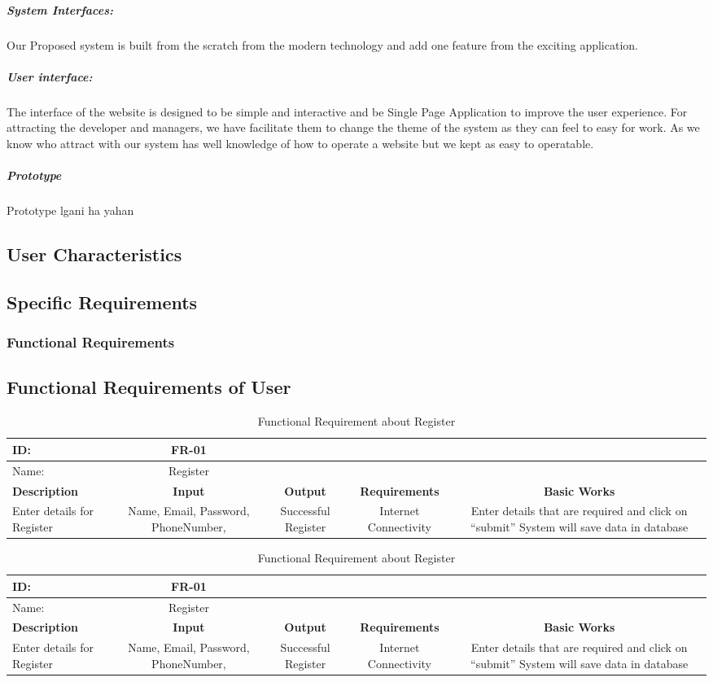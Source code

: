     \subparagraph{System Interfaces:}
    Our Proposed system is built from the scratch from the modern technology and add one feature from the exciting application. 
    \subparagraph{User interface: }
    The interface of the website is designed to be simple and interactive and be Single Page Application to improve the user experience. 
    For attracting the developer and managers, we have facilitate them to change the theme of the system as they can feel to easy for work.
    As we know who attract with our system has well knowledge of how to operate a website but we kept as easy to operatable.
    \subparagraph{Prototype}
    \huge{Prototype lgani ha yahan}
\subsection{User Characteristics}
\blindtext[2]

\subsection{Specific Requirements}
    \blindtext[2]
    \subsubsection{Functional Requirements}
    \blindtext[1]

\subsection{Functional Requirements of User}
\begin{table}[H]
\begin{tabular}{|l|c|c|c|c|}
    \hline
\bfseries ID: &\bfseries FR-01\\
\hline
Name:&Register\\
\hline
\bfseries Description&\bfseries Input&\bfseries Output &\bfseries Requirements&\bfseries Basic Works\\
\hline
Enter details for Register& Name, Email, Password, PhoneNumber, & Successful Register & Internet Connectivity&Enter details that are required and click on “submit” System will save data in database\\
\hline
\end{tabular}
\caption{Functional Requirement about Register}   

\begin{tabular}{|l|c|c|c|c|}
    \hline
\bfseries ID: &\bfseries FR-01\\
\hline
Name:&Register\\
\hline
\bfseries Description&\bfseries Input&\bfseries Output &\bfseries Requirements&\bfseries Basic Works\\
\hline
Enter details for Register& Name, Email, Password, PhoneNumber, & Successful Register & Internet Connectivity&Enter details that are required and click on “submit” System will save data in database\\
\hline
\end{tabular}
\caption{Functional Requirement about Register}   


\end{table}
